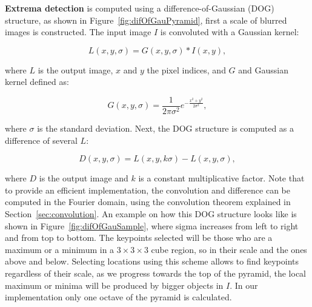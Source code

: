 \documentclass[12pt]{article}
\begin{document}
\textbf{Extrema detection} is computed using a difference-of-Gaussian (DOG) structure, as shown in Figure~\ref{fig:difOfGauPyramid}, first a scale of blurred images is constructed.
The input image $I$ is convoluted with a Gaussian kernel:

\begin{equation}
L(x,y,\sigma) = G(x,y,\sigma) * I(x,y),
\end{equation}

where $L$ is the output image, $x$ and $y$ the pixel indices, and $G$ and Gaussian kernel defined as:

\begin{equation}
G(x,y,\sigma) = \frac{1}{2 \pi \sigma^2} e^{- \frac{x^2 + y^2}{2 \sigma^2}},
\end{equation}

where $\sigma$ is the standard deviation.
Next, the DOG structure is computed as a difference of several $L$:

\begin{equation}
D(x,y,\sigma) = L(x,y, k\sigma) - L(x,y, \sigma),
\end{equation}

where $D$ is the output image and $k$ is a constant multiplicative factor.
Note that to provide an efficient implementation, the convolution and difference can be computed in the Fourier domain, using the convolution theorem explained in Section~\ref{sec:convolution}.
An example on how this DOG structure looks like is shown in Figure~\ref{fig:difOfGauSample}, where sigma increases from left to right and from top to bottom.
The keypoints selected will be those who are a maximum or a minimum in a $3 \times 3 \times 3$ cube region, so in their scale and the ones above and below.
Selecting locations using this scheme allows to find keypoints regardless of their scale, as we progress towards the top of the pyramid,  the local maximum or minima will be produced by bigger objects in $I$.
In our implementation only one octave of the pyramid is calculated.
\end{document}
